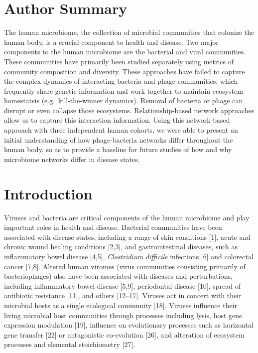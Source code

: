 \documentclass[12pt,]{article}
\begin{document}
\newpage

\section{Author Summary}\label{author-summary}

The human microbiome, the collection of microbial communities that
colonize the human body, is a crucial component to health and disease.
Two major components to the human microbiome are the bacterial and viral
communities. These communities have primarily been studied separately
using metrics of community composition and diversity. These approaches
have failed to capture the complex dynamics of interacting bacteria and
phage communities, which frequently share genetic information and work
together to maintain ecosystem homestatsis (e.g.~kill-the-winner
dynamics). Removal of bacteria or phage can disrupt or even collapse
those ecosystems. Relationship-based network approaches allow us to
capture this interaction information. Using this network-based approach
with three independent human cohorts, we were able to present an initial
understanding of how phage-bacteria networks differ throughout the human
body, so as to provide a baseline for future studies of how and why
microbiome networks differ in disease states.

\newpage

\section{Introduction}\label{introduction}

Viruses and bacteria are critical components of the human microbiome and
play important roles in health and disease. Bacterial communities have
been associated with disease states, including a range of skin
conditions {[}1{]}, acute and chronic wound healing conditions
{[}2,3{]}, and gastrointestinal diseases, such as inflammatory bowel
disease {[}4,5{]}, \emph{Clostridium difficile} infections {[}6{]} and
colorectal cancer {[}7,8{]}. Altered human viromes (virus communities
consisting primarily of bacteriophages) also have been associated with
diseases and perturbations, including inflammatory bowel disease
{[}5,9{]}, periodontal disease {[}10{]}, spread of antibiotic resistance
{[}11{]}, and others {[}12--17{]}. Viruses act in concert with their
microbial hosts as a single ecological community {[}18{]}. Viruses
influence their living microbial host communities through processes
including lysis, host gene expression modulation {[}19{]}, influence on
evolutionary processes such as horizontal gene transfer {[}22{]} or
antagonistic co-evolution {[}26{]}, and alteration of ecosystem
processes and elemental stoichiometry {[}27{]}.
\end{document}
